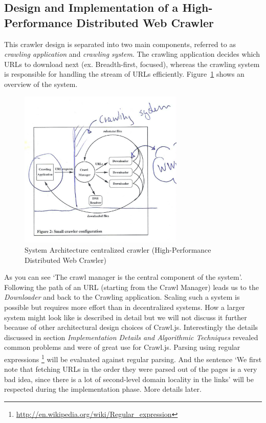 \subsection{Design and Implementation of a High-Performance Distributed Web Crawler~\cite{hp_crawler}}
This crawler design is separated into two main components, referred to as \emph{crawling application} and \emph{crawling system}. The crawling application decides which URLs to download next (ex. Breadth-first, focused), whereas the crawling system is responsible for handling the stream of URLs efficiently. Figure~\ref{hp_crawler} shows an overview of the system.
\begin{figure}[h]
\centering
  \includegraphics[width=0.7\textwidth]{Figures/hp_crawler.jpg}
\caption{System Architecture centralized crawler (High-Performance Distributed Web Crawler)}
\label{hp_crawler}
\end{figure}
As you can see `The crawl manager is the central component of the system'. Following the path of an URL (starting from the Crawl Manager) leads us to the \emph{Downloader} and back to the Crawling application. Scaling such a system is possible but requires more effort than in decentralized systems. How a larger system might look like is described in detail but we will not discuss it further because of other architectural design choices of Crawl.js.
Interestingly the details discussed in section \emph{Implementation Details and Algorithmic Techniques} revealed common problems and were of great use for Crawl.js. Parsing using regular expressions \footnote{\url{http://en.wikipedia.org/wiki/Regular_expression}} will be evaluated against regular parsing. And the sentence `We first note that fetching URLs in the order they were parsed out of the pages is a very bad idea, since there is a lot of second-level domain locality in the links' will be respected during the implementation phase. More details later. 

